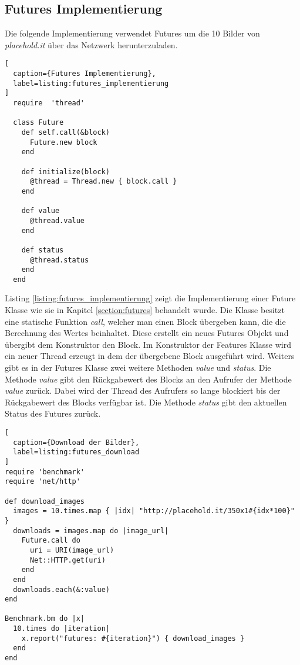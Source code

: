 \subsection{Futures Implementierung}

Die folgende Implementierung verwendet Futures um die 10 Bilder von \emph{placehold.it} über das Netzwerk herunterzuladen.

\begin{lstlisting}[
  caption={Futures Implementierung},
  label=listing:futures_implementierung
]
  require  'thread'

  class Future
    def self.call(&block)
      Future.new block
    end

    def initialize(block)
      @thread = Thread.new { block.call }
    end

    def value
      @thread.value
    end

    def status
      @thread.status
    end
  end
\end{lstlisting}

Listing \ref{listing:futures_implementierung} zeigt die Implementierung einer Future Klasse wie sie in Kapitel \ref{section:futures} behandelt wurde. Die Klasse besitzt eine statische Funktion \emph{call}, welcher man einen Block übergeben kann, die die Berechnung des Wertes beinhaltet. Diese erstellt ein neues Futures Objekt und übergibt dem Konstruktor den Block. Im Konstruktor der Features Klasse wird ein neuer Thread erzeugt in dem der übergebene Block ausgeführt wird. Weiters gibt es in der Futures Klasse zwei weitere Methoden \emph{value} und \emph{status}. Die Methode \emph{value} gibt den Rückgabewert des Blocks an den Aufrufer der Methode \emph{value} zurück. Dabei wird der Thread des Aufrufers so lange blockiert bis der Rückgabewert des Blocks verfügbar ist. Die Methode \emph{status} gibt den aktuellen Status des Futures zurück.

\begin{lstlisting}[
  caption={Download der Bilder},
  label=listing:futures_download
]
require 'benchmark'
require 'net/http'

def download_images
  images = 10.times.map { |idx| "http://placehold.it/350x1#{idx*100}" }
  downloads = images.map do |image_url|
    Future.call do
      uri = URI(image_url)
      Net::HTTP.get(uri)
    end
  end
  downloads.each(&:value)
end

Benchmark.bm do |x|
  10.times do |iteration|
    x.report("futures: #{iteration}") { download_images }
  end
end
\end{lstlisting}


